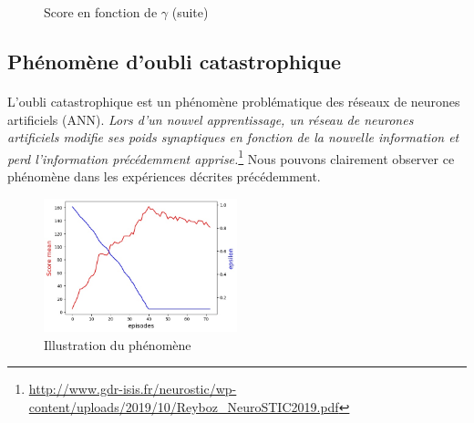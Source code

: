\documentclass[12pt,oneside,a4paper]{article}
\begin{document}
\begin{figure}[hbt!]
{        }
        \hspace{0mm}
        \caption{Score en fonction de $\gamma$ (suite)}
    \end{figure}
    \newpage

    \subsection{Phénomène d'oubli catastrophique}

    \paragraph{}
    L'oubli catastrophique est un phénomène problématique des réseaux de neurones artificiels (ANN).
    \textit{Lors d’un nouvel apprentissage, un réseau
    de neurones artificiels modifie ses poids synaptiques en fonction
    de la nouvelle information et perd l’information précédemment
    apprise.}\footnote{\url{http://www.gdr-isis.fr/neurostic/wp-content/uploads/2019/10/Reyboz_NeuroSTIC2019.pdf}}
    Nous pouvons clairement observer ce phénomène dans les expériences décrites précédemment.
    \begin{figure}[h]
        \centering
        \includegraphics[width=0.5\textwidth] {./catastrophic_forgetting.jpg}
        \caption{Illustration du phénomène}
    \end{figure}
\end{document}
